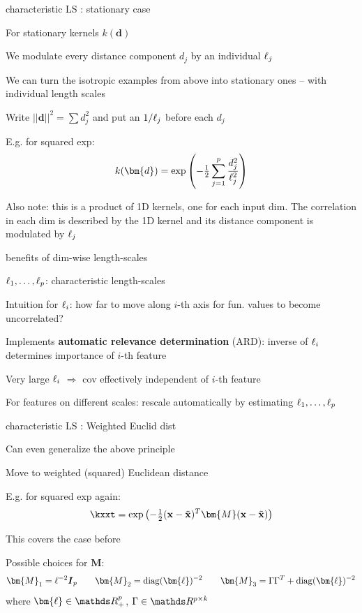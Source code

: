 \documentclass[11pt,compress,t,notes=noshow, xcolor=table]{beamer}
\begin{document}
\begin{framei}[sep=M]{characteristic LS : stationary case}
\item For stationary kernels $k(\bm{d})$ 
\item We modulate every distance component $d_j$ by an individual $\ell_j$
\item We can turn the isotropic examples from above into 
stationary ones -- with individual length scales
\item Write $||\bm{d}||^2 = \sum d_j^2$ and put an $1/\ell_j$ before each $d_j$
\item E.g. for squared exp:
$$
  k(\bm{d}) = \exp \left(- \tfrac{1}{2} \sumjp \frac{d_j^2}{\ell_j^2} \right)
$$
\item Also note: this is a product of 1D kernels, one for each input dim. The correlation in each dim is described by the 1D kernel and its distance component is modulated by $\ell_j$
\end{framei}


\begin{framei}[sep=L]{benefits of dim-wise length-scales}
\item $\ell_1,\dots, \ell_p$: characteristic length-scales
\item Intuition for $\ell_i$: how far to move along $i$-th axis for fun. values to become uncorrelated?
\item Implements \textbf{automatic relevance determination} (ARD): inverse of $\ell_i$ determines importance of $i$-th feature
\item Very large $\ell_i$ $\Rightarrow$ cov effectively independent of $i$-th feature
\item For features on different scales: rescale automatically by estimating $\ell_1,\dots, \ell_p$ 
\end{framei}



\begin{framei}[sep=M]{characteristic LS : Weighted Euclid dist}

\item Can even generalize the above principle
\item Move to weighted (squared) Euclidean distance
\item E.g. for squared exp again: 
$$
\kxxt = \exp \left(- \tfrac{1}{2}(\xv - \xtil)^T\bm{M} (\xv - \xtil )\right)
$$
\item This covers the case before
\item Possible choices for $\bm{M}$:
$$
\bm{M}_1 = \ls^{-2}\id_p \qquad \bm{M}_2 = \diag(\bm{\ls})^{-2} \qquad \bm{M}_3 = \Gamma \Gamma^T + \diag(\bm{\ls})^{-2}
$$
where $\bm{\ls} \in \R^p_+$, $\Gamma \in \R^{p \times k}$ 
\end{framei}
\end{document}
